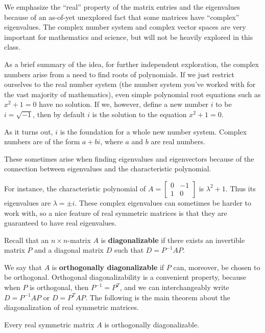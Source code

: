 \documentclass{ximera}
\begin{document}
\begin{remark}
  We emphasize the ``real'' property of the matrix entries and the eigenvalues because of an as-of-yet unexplored fact that some matrices have ``complex'' eigenvalues. The complex number system and complex vector spaces are very important for mathematics and science, but will not be heavily explored in this class. 

  As a brief summary of the idea, for further independent exploration, the complex numbers arise from a need to find roots of polynomials. If we just restrict ourselves to the real number system (the number system you've worked with for the vast majority of mathematics), even simple polynomial root equations such as $x^2+1=0$ have no solution. If we, however, define a new number $i$ to be $i=\sqrt{-1}$, then by default $i$ is the solution to the equation $x^2+1=0$.

  As it turns out, $i$ is the foundation for a whole new number system. Complex numbers are of the form $a+bi$, where $a$ and $b$ are real numbers. 

  These sometimes arise when finding eigenvalues and eigenvectors because of the connection between eigenvalues and the characteristic polynomial. 

  For instance, the characteristic polynomial of $A=\begin{bmatrix}
    0 & -1 \\ 1 & 0
  \end{bmatrix}$ is $\lambda^2+1$. Thus its eigenvalues are $\lambda=\pm i$. These complex eigenvalues can sometimes be harder to work with, so a nice feature of real symmetric matrices is that they are guaranteed to have real eigenvalues.
\end{remark}

Recall that an $n\times n$-matrix $A$ is \textbf{diagonalizable} if there exists an invertible matrix $P$
and a diagonal matrix $D$ such that $D = P^{-1}AP$. 

We say that $A$ is \textbf{orthogonally diagonalizable} if $P$ can, moreover, be
chosen to be orthogonal. Orthogonal diagonalizability is a convenient
property, because when $P$ is orthogonal, then $P^{-1}=P^T$, and we
can interchangeably write $D = P^{-1}AP$ or $D = P^TAP$.  The
following is the main theorem about the diagonalization of real
symmetric matrices.

\begin{theorem}\label{th:diagonalization-symmetric}
  Every real symmetric matrix $A$ is orthogonally diagonalizable.
\end{theorem}
\end{document}
